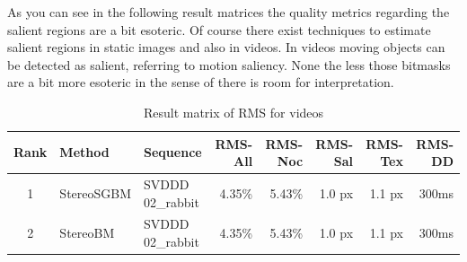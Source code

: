 \noindent As you can see in the following result matrices the quality metrics regarding the salient regions are a bit esoteric. Of course there exist techniques to estimate salient regions in static images and also in videos. In videos moving objects can be detected as salient, referring to motion saliency\citep{opencv_library, wang2014fast}. None the less those bitmasks are a bit more esoteric in the sense of there is room for interpretation.

\begin{landscape}
  \begin{table}[h!]
  \centering
  \begin{tabular}{cll|rrrrr}
    \hline
    \textbf{Rank} & \textbf{Method} & \textbf{Sequence} & \textbf{RMS-All} & \textbf{RMS-Noc} & \textbf{RMS-Sal} & \textbf{RMS-Tex} & \textbf{RMS-DD} \\ \hline \hline
    1 & StereoSGBM & SVDDD 02\_rabbit & 4.35\% & \cellcolor{green!60}5.43\% & 1.0 px & 1.1 px & 300ms \\
    2 & StereoBM & SVDDD 02\_rabbit & 4.35\% & 5.43\% & 1.0 px & \cellcolor{red!60}1.1 px & 300ms \\ \hline
  \end{tabular}
  \caption{Result matrix of RMS for videos}
  \label{tab:result-videos-rms}
  \end{table}
\end{landscape}

